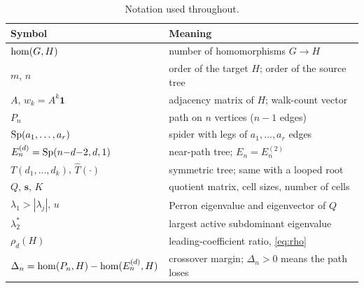 \begin{table}[H]
\centering
\caption{Notation used throughout.}
\label{tab:notation}
\begin{tabular}{@{}ll@{}}
  \toprule
  Symbol & Meaning \\
  \midrule
  $\mathrm{hom}(G,H)$ & number of homomorphisms $G \to H$ \\
  $m$, $n$ & order of the target $H$; order of the source tree \\
  $A$, $w_k = A^k\mathbf{1}$ & adjacency matrix of $H$; walk-count vector \\
  $P_n$ & path on $n$ vertices ($n-1$ edges) \\
  $\operatorname{Sp}(a_1,\dots,a_r)$ & spider with legs of $a_1,\dots,a_r$ edges \\
  $E_n^{(d)} = \operatorname{Sp}(n{-}d{-}2, d, 1)$ & near-path tree; $E_n = E_n^{(2)}$ \\
  $T(d_1,\dots,d_k)$, $\hat T(\cdot)$ & symmetric tree; same with a looped root \\
  $Q$, $\mathbf{s}$, $K$ & quotient matrix, cell sizes, number of cells \\
  $\lambda_1 > |\lambda_j|$, $u$ & Perron eigenvalue and eigenvector of $Q$ \\
  $\lambda_2^{*}$ & largest active subdominant eigenvalue \\
  $\rho_d(H)$ & leading-coefficient ratio, \eqref{eq:rho} \\
  $\Delta_n = \mathrm{hom}(P_n,H) - \mathrm{hom}(E_n^{(d)},H)$ & crossover margin; $\Delta_n > 0$ means the path loses \\
  \bottomrule
\end{tabular}
\end{table}
